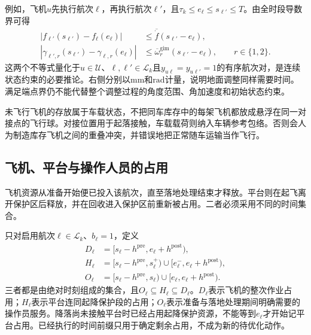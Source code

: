 例如，飞机$u$先执行航次$\ell$，再执行航次$\ell'$，且$\tau_k\le e_\ell\le s_{\ell'}\le T$。由全时段导数界可得
\begin{align}
 |f_{\ell'}(s_{\ell'})-f_\ell(e_\ell)|
 &\le\overline{\dot f}(s_{\ell'}-e_\ell),
 \label{s0504:between_sortie_focal}\\
 |\gamma_{\ell',r}(s_{\ell'})-\gamma_{\ell,r}(e_\ell)|
 &\le\overline\omega_r^{\mathrm{gim}}(s_{\ell'}-e_\ell),
 \qquad r\in\{1,2\}.
 \label{s0504:between_sortie_gimbal}
\end{align}
这两个不等式量化于$u\in\mathcal U$、$\ell,\ell'\in\mathcal L_k$且$y_{u\ell}=y_{u\ell'}=1$的有序航次对，是连续状态约束的必要推论。右侧分别以$\mathrm{mm}$和$\mathrm{rad}$计量，说明地面调整同样需要时间。满足端点界仍不能代替整个调整过程的角度范围、角加速度和初始状态约束。

未飞行飞机的存放属于车载状态，不把同车库存中的每架飞机都放成悬浮在同一对接点的飞行球。对接位置用于起落接触，车载载荷则纳入车辆参考包络。否则会人为制造库存飞机之间的重叠冲突，并错误地把正常随车运输当作飞行。

\subsection{飞机、平台与操作人员的占用}

飞机资源从准备开始便已投入该航次，直至落地处理结束才释放。平台则在起飞离开保护区后释放，并在回收进入保护区前重新被占用。二者必须采用不同的时间集合。

只对启用航次$\ell\in\mathcal L_k$、$b_\ell=1$，定义
\begin{align}
 D_\ell
 &=[s_\ell-h^{\mathrm{pre}},e_\ell+h^{\mathrm{post}}),
 \label{s0504:aircraft_interval}\\
 H_\ell
 &=[s_\ell-h^{\mathrm{pre}},s_\ell^+)
   \cup[e_\ell^-,e_\ell+h^{\mathrm{post}}),
 \label{s0504:pad_intervals}\\
 O_\ell
 &=[s_\ell-h^{\mathrm{pre}},s_\ell)
   \cup[e_\ell,e_\ell+h^{\mathrm{post}}).
 \label{s0504:operator_intervals}
\end{align}
三者都是由绝对时刻组成的集合，且$O_\ell\subseteq H_\ell\subseteq D_\ell$。$D_\ell$表示飞机的整次作业占用；$H_\ell$表示平台连同起降保护段的占用；$O_\ell$表示准备与落地处理期间明确需要的操作员服务。降落尚未接触平台时已经占用起降保护资源，不能等到$e_\ell$才开始记平台占用。已经执行的时间前缀只用于确定剩余占用，不成为新的待优化动作。

